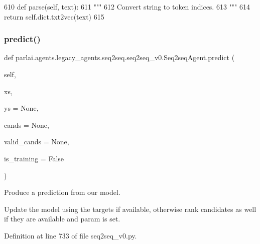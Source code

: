 \begin{DoxyCode}
610     \textcolor{keyword}{def }parse(self, text):
611         \textcolor{stringliteral}{"""}
612 \textcolor{stringliteral}{        Convert string to token indices.}
613 \textcolor{stringliteral}{        """}
614         \textcolor{keywordflow}{return} self.dict.txt2vec(text)
615 
\end{DoxyCode}
\mbox{\label{classparlai_1_1agents_1_1legacy__agents_1_1seq2seq_1_1seq2seq__v0_1_1Seq2seqAgent_aadec879f7d8daa6451076e4fb358715b}} 
\subsubsection{\texorpdfstring{predict()}{predict()}}
{\footnotesize\ttfamily def parlai.\+agents.\+legacy\+\_\+agents.\+seq2seq.\+seq2seq\+\_\+v0.\+Seq2seq\+Agent.\+predict (\begin{DoxyParamCaption}\item[{}]{self,  }\item[{}]{xs,  }\item[{}]{ys = {\ttfamily None},  }\item[{}]{cands = {\ttfamily None},  }\item[{}]{valid\+\_\+cands = {\ttfamily None},  }\item[{}]{is\+\_\+training = {\ttfamily False} }\end{DoxyParamCaption})}

\begin{DoxyVerb}Produce a prediction from our model.

Update the model using the targets if available, otherwise rank candidates as
well if they are available and param is set.
\end{DoxyVerb}
 

Definition at line 733 of file seq2seq\+\_\+v0.\+py.


